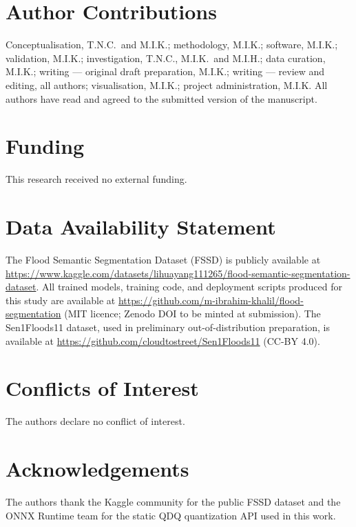 
\section*{Author Contributions}
Conceptualisation, T.N.C.\ and M.I.K.; methodology, M.I.K.; software, M.I.K.; validation, M.I.K.; investigation, T.N.C., M.I.K.\ and M.I.H.; data curation, M.I.K.; writing --- original draft preparation, M.I.K.; writing --- review and editing, all authors; visualisation, M.I.K.; project administration, M.I.K. All authors have read and agreed to the submitted version of the manuscript.

\section*{Funding}
This research received no external funding.

\section*{Data Availability Statement}
The Flood Semantic Segmentation Dataset (FSSD) is publicly available at \url{https://www.kaggle.com/datasets/lihuayang111265/flood-semantic-segmentation-dataset}. All trained models, training code, and deployment scripts produced for this study are available at \url{https://github.com/m-ibrahim-khalil/flood-segmentation} (MIT licence; Zenodo DOI to be minted at submission). The Sen1Floods11 dataset, used in preliminary out-of-distribution preparation, is available at \url{https://github.com/cloudtostreet/Sen1Floods11} (CC-BY 4.0).

\section*{Conflicts of Interest}
The authors declare no conflict of interest.

\section*{Acknowledgements}
The authors thank the Kaggle community for the public FSSD dataset and the ONNX Runtime team for the static QDQ quantization API used in this work.
